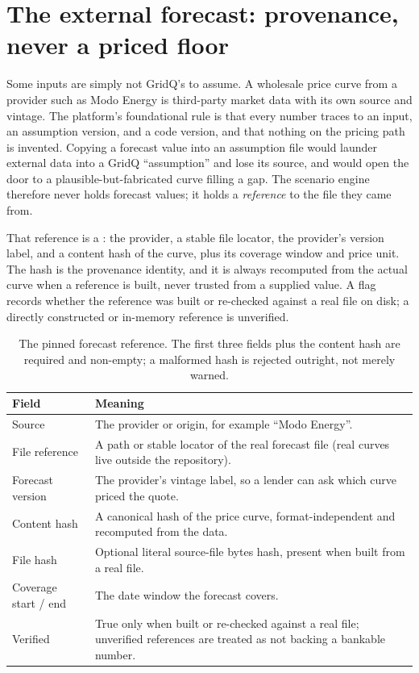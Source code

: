 \section{The external forecast: provenance, never a priced floor}

Some inputs are simply not GridQ's to assume. A wholesale price curve from a provider such as Modo Energy is third-party market data with its own source and vintage. The platform's foundational rule is that every number traces to an input, an assumption version, and a code version, and that nothing on the pricing path is invented. Copying a forecast value into an assumption file would launder external data into a GridQ ``assumption'' and lose its source, and would open the door to a plausible-but-fabricated curve filling a gap. The scenario engine therefore never holds forecast values; it holds a \emph{reference} to the file they came from.

That reference is a : the provider, a stable file locator, the provider's version label, and a content hash of the curve, plus its coverage window and price unit. The hash is the provenance identity, and it is always recomputed from the actual curve when a reference is built, never trusted from a supplied value. A  flag records whether the reference was built or re-checked against a real file on disk; a directly constructed or in-memory reference is unverified.

\begin{table}[H]
\centering
\caption{The pinned forecast reference. The first three fields plus the content hash are required and non-empty; a malformed hash is rejected outright, not merely warned.}
\label{tab:forecastref}
\small\sffamily
\begin{tabularx}{\textwidth}{@{}l L@{}}
\toprule
\textbf{Field} & \textbf{Meaning} \\
\midrule
Source & The provider or origin, for example ``Modo Energy''. \\
File reference & A path or stable locator of the real forecast file (real curves live outside the repository). \\
Forecast version & The provider's vintage label, so a lender can ask which curve priced the quote. \\
Content hash & A canonical  hash of the price curve, format-independent and recomputed from the data. \\
File hash & Optional literal source-file bytes hash, present when built from a real file. \\
Coverage start / end & The date window the forecast covers. \\
Verified & True only when built or re-checked against a real file; unverified references are treated as not backing a bankable number. \\
\bottomrule
\end{tabularx}
\end{table}

